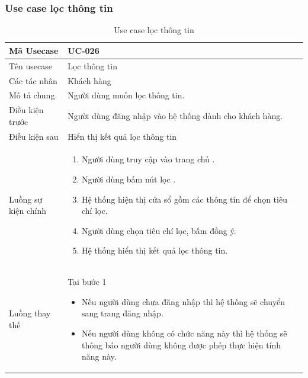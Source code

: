 \documentclass[12pt,a4paper]{article}
\begin{document}
    \subsubsection*{Use case lọc thông tin}
    \begin{table}[H]
        \centering
        \begin{tabular}{|p{3.5cm}|p{11.5cm}|c|}
            \hline
            Mã Usecase      & UC-026                                                 \\
            \hline
            Tên usecase     & Lọc thông tin                                          \\
            \hline
            Các tác nhân    & Khách hàng                                             \\
            \hline
            Mô tả chung     & Người dùng muốn lọc thông tin.                         \\
            \hline

            Điều kiện trước & Người dùng đăng nhập vào hệ thống dành cho khách hàng. \\
            \hline

            Điều kiện sau   & Hiển thị kết quả lọc thông tin                         \\
            \hline

            Luồng sự kiện chính & \vspace{-.8cm}\begin{enumerate}
                                                    \item Người dùng truy cập vào trang chủ .
                                                    \item Người dùng bấm nút lọc .
                                                    \item Hệ thống hiện thị cửa sổ gồm các thông tin để chọn tiêu chí lọc.
                                                    \item Người dùng chọn tiêu chí lọc, bấm đồng ý.
                                                    \item Hệ thống hiển thị kết quả lọc thông tin.
            \end{enumerate}
            \\
            \hline
            Luồng thay thế & Tại bước 1\newline
            \vspace{-.8cm}\begin{itemize}
                              \item Nếu người dùng chưa đăng nhập thì hệ thống sẽ chuyển sang trang đăng nhập.
                              \item Nếu người dùng không có chức năng này thì hệ thống sẽ thông báo người dùng không được phép thực hiện tính năng này.
            \end{itemize}

            \\ \hline
        \end{tabular}
        \caption{Use case lọc thông tin}

    \end{table}
\end{document}
